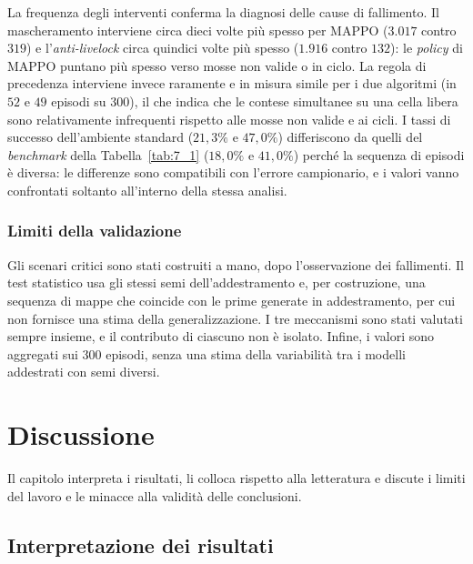 \documentclass[12pt,a4paper,twoside]{report}
\newcommand{\paginabianca}{\clearpage\null\thispagestyle{empty}\clearpage}
\begin{document}
La frequenza degli interventi conferma la diagnosi delle cause di fallimento. Il mascheramento interviene circa dieci volte più spesso per MAPPO ($3.017$ contro $319$) e l'\emph{anti-livelock} circa quindici volte più spesso ($1.916$ contro $132$): le \emph{policy} di MAPPO puntano più spesso verso mosse non valide o in ciclo. La regola di precedenza interviene invece raramente e in misura simile per i due algoritmi (in $52$ e $49$ episodi su $300$), il che indica che le contese simultanee su una cella libera sono relativamente infrequenti rispetto alle mosse non valide e ai cicli. I tassi di successo dell'ambiente standard ($21,3\%$ e $47,0\%$) differiscono da quelli del \emph{benchmark} della Tabella~\ref{tab:7_1} ($18,0\%$ e $41,0\%$) perché la sequenza di episodi è diversa: le differenze sono compatibili con l'errore campionario, e i valori vanno confrontati soltanto all'interno della stessa analisi.

\subsection{Limiti della validazione}
Gli scenari critici sono stati costruiti a mano, dopo l'osservazione dei fallimenti. Il test statistico usa gli stessi semi dell'addestramento e, per costruzione, una sequenza di mappe che coincide con le prime generate in addestramento, per cui non fornisce una stima della generalizzazione. I tre meccanismi sono stati valutati sempre insieme, e il contributo di ciascuno non è isolato. Infine, i valori sono aggregati sui $300$ episodi, senza una stima della variabilità tra i modelli addestrati con semi diversi.

\paginabianca
\chapter{Discussione}
\label{chap:discussione}

Il capitolo interpreta i risultati, li colloca rispetto alla letteratura e discute i limiti del lavoro e le minacce alla validità delle conclusioni.

\section{Interpretazione dei risultati}
\label{sec:interpretazione_risultati}
\end{document}
